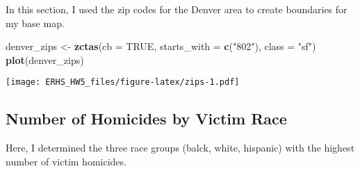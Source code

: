 \documentclass[]{article}
\newenvironment{Shaded}{\begin{snugshade}}{\end{snugshade}}
\newcommand{\DataTypeTok}[1]{\textcolor[rgb]{0.13,0.29,0.53}{#1}}
\newcommand{\KeywordTok}[1]{\textcolor[rgb]{0.13,0.29,0.53}{\textbf{#1}}}
\newcommand{\NormalTok}[1]{#1}
\newcommand{\OperatorTok}[1]{\textcolor[rgb]{0.81,0.36,0.00}{\textbf{#1}}}
\newcommand{\OtherTok}[1]{\textcolor[rgb]{0.56,0.35,0.01}{#1}}
\newcommand{\StringTok}[1]{\textcolor[rgb]{0.31,0.60,0.02}{#1}}
\begin{document}
In this section, I used the zip codes for the Denver area to create
boundaries for my base map.

\begin{Shaded}
\begin{Highlighting}[]
\NormalTok{denver_zips <-}\StringTok{ }\KeywordTok{zctas}\NormalTok{(}\DataTypeTok{cb =} \OtherTok{TRUE}\NormalTok{, }\DataTypeTok{starts_with =} \KeywordTok{c}\NormalTok{(}\StringTok{"802"}\NormalTok{), }\DataTypeTok{class =} \StringTok{"sf"}\NormalTok{)}
\KeywordTok{plot}\NormalTok{(denver_zips)}
\end{Highlighting}
\end{Shaded}

\texttt{[image: ERHS\_HW5\_files/figure-latex/zips-1.pdf]}

\hypertarget{number-of-homicides-by-victim-race}{%
\subsection{Number of Homicides by Victim
Race}\label{number-of-homicides-by-victim-race}}

Here, I determined the three race groups (balck, white, hispanic) with
the highest number of victim homicides.

\begin{Shaded}
\end{Shaded}
\end{document}
